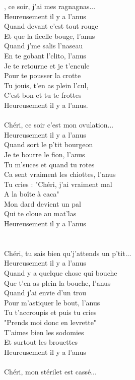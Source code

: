 , ce soir, j'ai mes ragnagnas...
\\Heureusement il y a l'anus
\\Quand devant c'est tout rouge
\\Et que la ficelle bouge, l'anus
\\Quand j'me salis l'naseau
\\En te gobant l'clito, l'anus
\\Je te retourne et je t'encule
\\Pour te pousser la crotte
\\Tu jouis, t'en as plein l'cul,
\\C'est bon et tu te frottes
\\Heureusement il y a l'anus.
\\\\Chéri, ce soir c'est mon ovulation...
\\Heureusement il y a l'anus
\\Quand sort le p'tit bourgeon
\\Je te bourre le fion, l'anus
\\Tu m'suces et quand tu rotes
\\Ca sent vraiment les chiottes, l'anus
\\Tu cries : "Chéri, j'ai vraiment mal
\\A la boîte à caca"
\\Mon dard devient un pal
\\Qui te cloue au mat'las
\\Heureusement il y a l'anus
\\\\\\Chéri, tu sais bien qu'j'attends un p'tit...
\\Heureusement il y a l'anus
\\Quand y a quelque chose qui bouche
\\Que t'en as plein la bouche, l'anus
\\Quand j'ai envie d'un trou
\\Pour m'astiquer le bout, l'anus
\\Tu t'accroupis et puis tu cries
\\"Prends moi donc en levrette"
\\T'aimes bien les sodomies
\\Et surtout les brouettes
\\Heureusement il y a l'anus
\\\\Chéri, mon stérilet est cassé...
